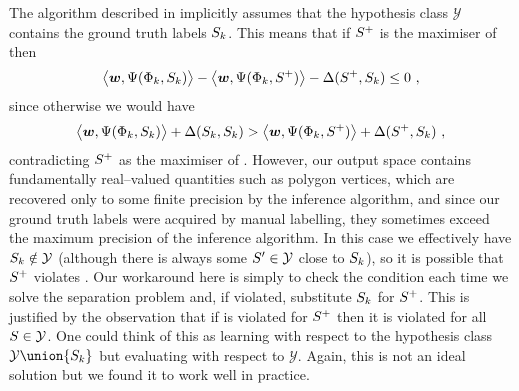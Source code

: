 The algorithm described in \cite{Tsochantaridis04} implicitly assumes
that the hypothesis class $\mathcal{Y}$ contains the ground truth
labels $\Seam_k$. This means that if $\AugSeam$ is the maximiser of
 then
\begin{equation}
  \bigl\langle\Model, \JointFtr(\Features_k,\Seam_k)\bigr\rangle
  - \bigl\langle\Model, \JointFtr(\Features_k,\AugSeam)\bigr\rangle
  - \Loss(\AugSeam,\Seam_k) 
  \leq 
  0 ~,
  \label{eq:positive-slacks}
\end{equation}
since otherwise we would have
\begin{equation}
  \bigl\langle\Model, \JointFtr(\Features_k,\Seam_k)\bigr\rangle
  + \Loss(\Seam_k,\Seam_k) 
  >
  \bigl\langle\Model, \JointFtr(\Features_k,\AugSeam)\bigr\rangle
  + \Loss(\AugSeam,\Seam_k) ~,
\end{equation}
contradicting $\AugSeam$ as the maximiser of
. However, our output space contains
fundamentally real--valued quantities such as polygon vertices, which
are recovered only to some finite precision by the inference
algorithm, and since our ground truth labels were acquired by manual
labelling, they sometimes exceed the maximum precision of the
inference algorithm. In this case we effectively have $\Seam_k \notin
\mathcal{Y}$ (although there is always some $\Seam' \in \mathcal{Y}$
close to $\Seam_k$), so it is possible that $\AugSeam$ violates
. Our workaround here is simply to check the
condition  each time we solve the separation
problem and, if violated, substitute $\Seam_k$ for $\AugSeam$. This is
justified by the observation that if  is
violated for $\AugSeam$ then it is violated for all
$\Seam\in\mathcal{Y}$. One could think of this as learning with
respect to the hypothesis class $\mathcal{Y} \union \{\Seam_k\}$ but
evaluating with respect to $\mathcal{Y}$. Again, this is not an ideal
solution but we found it to work well in practice.



